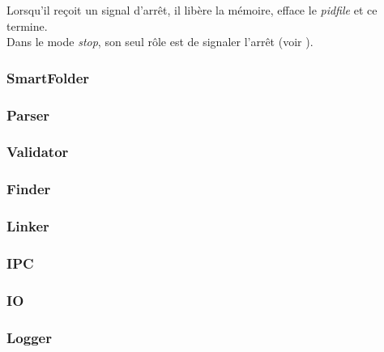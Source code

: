 \documentclass[11pt, a4paper]{article}
\begin{document}
Lorsqu'il reçoit un signal d'arrêt, il libère la mémoire, efface le \textit{pidfile} et ce termine. \\

Dans le mode \textit{stop}, son seul rôle est de signaler l'arrêt (voir ).

\subsubsection{SmartFolder}

\subsubsection{Parser}

\subsubsection{Validator}

\subsubsection{Finder}

\subsubsection{Linker}

\subsubsection{IPC}
\label{sec:ipc}

\subsubsection{IO}

\subsubsection{Logger}
\end{document}
